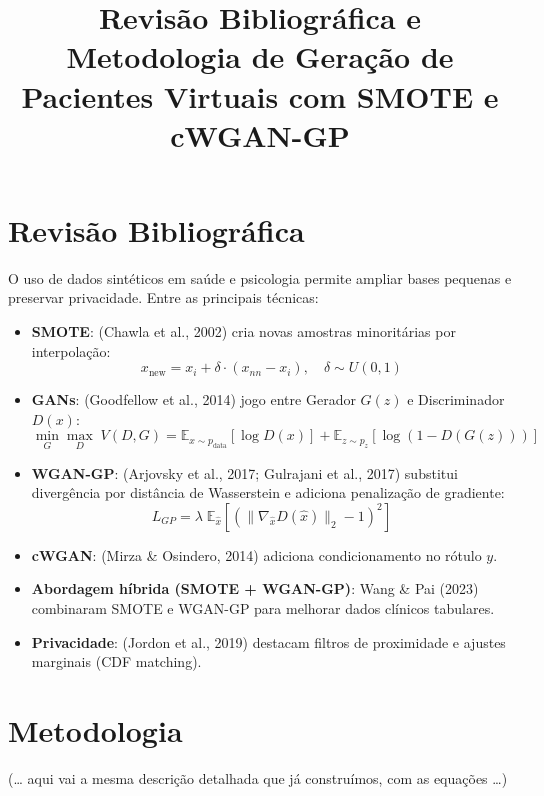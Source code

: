 \documentclass[12pt,a4paper]{article}
\title{Revisão Bibliográfica e Metodologia de Geração de Pacientes Virtuais com SMOTE e cWGAN-GP}
\author{}
\date{}
\begin{document}
\maketitle

\section{Revisão Bibliográfica}

O uso de dados sintéticos em saúde e psicologia permite ampliar bases pequenas e preservar privacidade. Entre as principais técnicas:

\begin{itemize}
    \item \textbf{SMOTE}: (Chawla et al., 2002) cria novas amostras minoritárias por interpolação:
    \[
        x_{\text{new}} = x_i + \delta \cdot (x_{nn} - x_i), \quad \delta \sim U(0,1)
    \]

    \item \textbf{GANs}: (Goodfellow et al., 2014) jogo entre Gerador $G(z)$ e Discriminador $D(x)$:
    \[
        \min_G \max_D \; V(D,G) = \mathbb{E}_{x \sim p_{\text{data}}}[\log D(x)] + \mathbb{E}_{z \sim p_z}[\log(1 - D(G(z)))]
    \]

    \item \textbf{WGAN-GP}: (Arjovsky et al., 2017; Gulrajani et al., 2017) substitui divergência por distância de Wasserstein e adiciona penalização de gradiente:
    \[
        L_{GP} = \lambda \; \mathbb{E}_{\hat{x}} \left[ \left(\|\nabla_{\hat{x}} D(\hat{x})\|_2 - 1 \right)^2 \right]
    \]

    \item \textbf{cWGAN}: (Mirza \& Osindero, 2014) adiciona condicionamento no rótulo $y$.

    \item \textbf{Abordagem híbrida (SMOTE + WGAN-GP)}: Wang \& Pai (2023) combinaram SMOTE e WGAN-GP para melhorar dados clínicos tabulares.

    \item \textbf{Privacidade}: (Jordon et al., 2019) destacam filtros de proximidade e ajustes marginais (CDF matching).
\end{itemize}

\section{Metodologia}

(… aqui vai a mesma descrição detalhada que já construímos, com as equações …)
\end{document}

